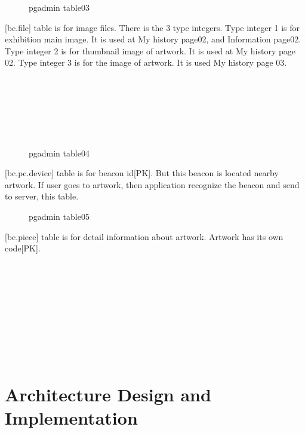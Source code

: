 \documentclass[conference]{IEEEtran}
\begin{document}
\begin{figure}[htbp]
\begin{center}
    \caption{pgadmin table03} 
\end{center}
\end{figure}

[bc.file] table is for image files. There is the 3 type integers. Type integer 1 is for exhibition main image. It is used at My history page02, and Information page02. Type integer 2 is for thumbnail image of artwork. It is used at My history page 02. Type integer 3 is for the image of artwork. It is used My history page 03.\\\\\\\\\\\\\\


\begin{figure}[htbp]
\begin{center}
    \caption{pgadmin table04} 
\end{center}
\end{figure}

[bc.pc.device] table is for beacon id[PK]. But this beacon is located nearby artwork. If user goes to artwork, then application recognize the beacon and send to server, this table. \\

\begin{figure}[htbp]
\begin{center}
    \caption{pgadmin table05} 
\end{center}
\end{figure}

[bc.piece] table is for detail information about artwork. Artwork has its own code[PK]. \\\\\\\\\\\\\\\\\\\\

\section{Architecture Design and Implementation}
\end{document}
